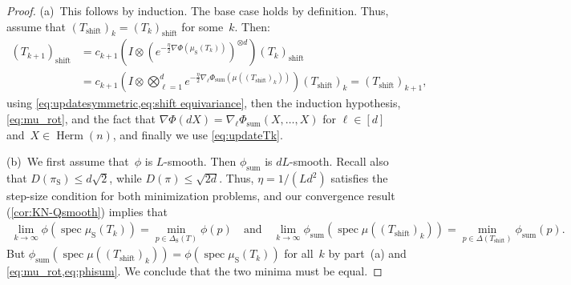 \documentclass[11pt,letterpaper]{article}
\numberwithin{equation}{section}
\DeclareMathOperator{\spec}{spec}
\DeclareMathOperator{\Sym}{S}
\DeclareMathOperator{\Herm}{Herm}
\DeclareMathOperator{\Shf}{shift}
\DeclareMathOperator{\Sum}{sum}
\begin{document}
\begin{proof}
(a)~This follows by induction.
The base case holds by definition.
Thus, assume that $(T_{\Shf})_k = (T_k)_{\Shf}$ for some~$k$.
Then:
\begin{align*}
 (T_{k+1})_{\Shf}
&= c_{k+1} \left(I\otimes\left(e^{-\frac\eta2\nabla\Phi(\mu_{\Sym}(T_k))}\right)^{\otimes d}\right) (T_k)_{\Shf} \\
&= c_{k+1} \left(I\otimes \bigotimes_{\ell=1}^d e^{-\frac\eta2\nabla_\ell\Phi_{\Sum}(\mu((T_{\Shf})_k))} \right) (T_{\Shf})_k = (T_{\Shf})_{k+1},
\end{align*}
using \cref{eq:updatesymmetric,eq:shift equivariance}, then the induction hypothesis, \cref{eq:mu_rot}, and the fact that $\nabla\Phi(d X) = \nabla_\ell\Phi_{\Sum}(X, \ldots, X)$ for $\ell \in [d]$ and~$X\in\Herm(n)$, and finally we use \cref{eq:updateTk}.

(b)~We first assume that~$\phi$ is $L$-smooth.
Then $\phi_{\Sum}$ is $dL$-smooth.
Recall also that $D(\pi_{\Sym}) \leq d\sqrt{2}$, while $D(\pi) \leq \sqrt{2d}$.
Thus, $\eta = 1/(L d^2)$ satisfies the step-size condition for both minimization problems, and our convergence result (\cref{cor:KN-Qsmooth}) implies that
\begin{align*}
    \lim_{k\to\infty} \phi(\spec\mu_{\Sym}(T_k)) = \min_{p \in \Delta_{\Sym}(T)}\phi(p)
    \quad\text{and}\quad
    \lim_{k\to\infty} \phi_{\Sum}(\spec\mu((T_{\Shf})_k)) = \min_{p \in \Delta(T_{\Shf})}\phi_{\Sum}(p).
\end{align*}
But $\phi_{\Sum}(\spec\mu((T_{\Shf})_k)) = \phi(\spec\mu_{\Sym}(T_k))$ for all~$k$ by part~(a) and \cref{eq:mu_rot,eq:phisum}.
We conclude that the two minima must be equal.


\end{proof}
\end{document}
